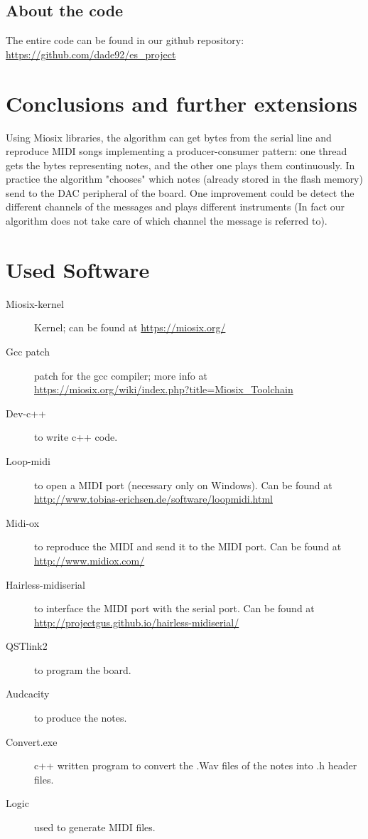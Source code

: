 \documentclass[12pt]{article}
\begin{document}
\subsection{About the code}
The entire code can be found in our github repository: \url{https://github.com/dade92/es_project}

\section{Conclusions and further extensions}
Using Miosix libraries, the algorithm can get bytes from the serial line and reproduce MIDI songs implementing a producer-consumer pattern: one thread gets the bytes representing notes, and the other one plays them continuously. In practice the algorithm "chooses" which notes (already stored in the flash memory) send to the DAC peripheral of the board. One improvement could be detect the different channels of the messages and plays different instruments (In fact our algorithm does not take care of which channel the message is referred to). 

\section{Used Software} \label{sec:used}
\begin{description} 
	\item[Miosix-kernel] Kernel; can be found at \url{https://miosix.org/}
	\item[Gcc patch] patch for the gcc compiler; more info at \url{https://miosix.org/wiki/index.php?title=Miosix_Toolchain}
	\item[Dev-c++] to write c++  code.
	\item[Loop-midi] to open a MIDI port (necessary only on Windows). Can be found at \url{http://www.tobias-erichsen.de/software/loopmidi.html}
	\item[Midi-ox] to reproduce the MIDI and send it to the MIDI port. Can be found at \url{http://www.midiox.com/}
	\item[Hairless-midiserial] to interface the MIDI port with the serial port. Can be found at \url{http://projectgus.github.io/hairless-midiserial/}
	\item[QSTlink2] to program the board.
	\item[Audcacity] to produce the notes.
	\item[Convert.exe] c++ written program to convert the .Wav files  of the notes into .h header files.
	\item[Logic] used to generate MIDI files.
\end{description}
\end{document}
